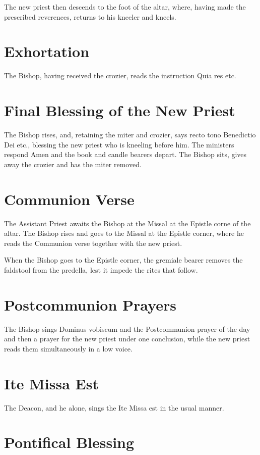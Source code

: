 \documentclass{report}
\begin{document}
{	The new priest then descends to the foot of the altar, where, having made
	the prescribed reverences, returns to his kneeler and kneels.

	\section{Exhortation}

	The Bishop, having received the crozier, reads the instruction Quia res
	etc.

	\section{Final Blessing of the New Priest}

	The Bishop rises, and, retaining the miter and crozier, says recto tono
	Benedictio Dei etc., blessing the new priest who is kneeling before him.
	The ministers respond Amen and the book and candle bearers depart. The
	Bishop sits, gives away the crozier and has the miter removed.

	\section{Communion Verse}

	The Assistant Priest awaits the Bishop at the Missal at the Epistle corne
	of the altar. The Bishop rises and goes to the Missal at the Epistle
	corner, where he reads the Communion verse together with the new priest.

	When the Bishop goes to the Epistle corner, the gremiale bearer removes the
	faldstool from the predella, lest it impede the rites that follow.

	\section{Postcommunion Prayers}

	The Bishop sings Dominus vobiscum and the Postcommunion prayer of the day
	and then a prayer for the new priest under one conclusion, while the new
	priest reads them simultaneously in a low voice.

	\section{Ite Missa Est}

	The Deacon, and he alone, sings the Ite Missa est in the usual manner.

	\section{Pontifical Blessing}

}
\end{document}

